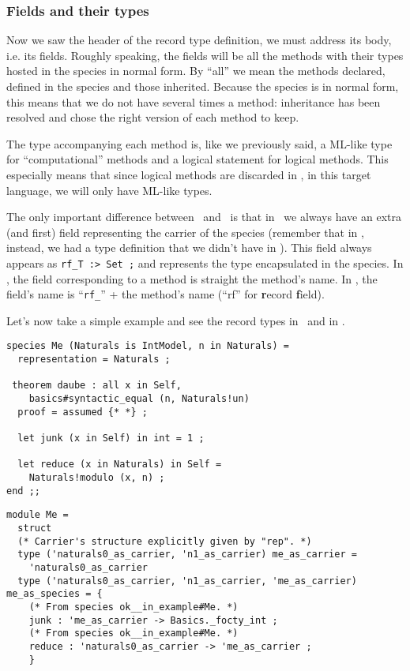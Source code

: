 \subsubsection{Fields and their types}
Now we saw the header of the record type definition, we must address
its body, i.e. its fields. Roughly speaking, the fields will be all
the methods with their types hosted in the species in normal form. By
``all'' we mean the methods declared, defined in the species and those
inherited. Because the species is in normal form, this means that we
do not have several times a method: inheritance has been resolved and
chose the right version of each method to keep.

The type accompanying each method is, like we previously said, a
ML-like type for ``computational'' methods and a logical statement for
logical methods. This especially means that since logical methods are
discarded in \ocaml, in this target language, we will only have
ML-like types.

The only important difference between \ocaml\ and \coq\ is that in
\coq\ we always have an extra (and first) field representing the
carrier of the species (remember that in \ocaml, instead, we had a
type definition that we didn't have in \coq). This field always
appears as {\tt  rf\_T :> Set ;} and represents the type encapsulated
in the species. In \ocaml, the field corresponding to a method is
straight the method's name. In \coq, the field's name is
``{\tt rf\_}'' + the method's name (``rf'' for {\bf r}ecord
{\bf f}ield).

Let's now take a simple example and see the record types in
\ocaml\ and in \coq.

{\footnotesize
\begin{lstlisting}
species Me (Naturals is IntModel, n in Naturals) =
  representation = Naturals ;

 theorem daube : all x in Self,
    basics#syntactic_equal (n, Naturals!un)
  proof = assumed {* *} ;

  let junk (x in Self) in int = 1 ;

  let reduce (x in Naturals) in Self =
    Naturals!modulo (x, n) ;
end ;;
\end{lstlisting}}


{\footnotesize
\begin{lstlisting}[language=MyOCaml]
module Me =
  struct
  (* Carrier's structure explicitly given by "rep". *)
  type ('naturals0_as_carrier, 'n1_as_carrier) me_as_carrier =
    'naturals0_as_carrier
  type ('naturals0_as_carrier, 'n1_as_carrier, 'me_as_carrier) me_as_species = {
    (* From species ok__in_example#Me. *)
    junk : 'me_as_carrier -> Basics._focty_int ;
    (* From species ok__in_example#Me. *)
    reduce : 'naturals0_as_carrier -> 'me_as_carrier ;
    }
\end{lstlisting}}



